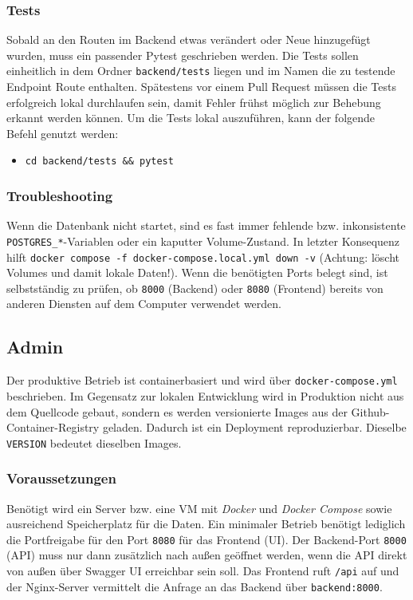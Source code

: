 \documentclass[12pt,a4paper]{article}
\begin{document}
    \subsubsection{Tests}
        Sobald an den Routen im Backend etwas verändert oder Neue hinzugefügt wurden, muss ein passender Pytest geschrieben werden.
        Die Tests sollen einheitlich in dem Ordner \texttt{backend/tests} liegen und im Namen die zu testende Endpoint Route enthalten.
        Spätestens vor einem Pull Request müssen die Tests erfolgreich lokal durchlaufen sein, damit Fehler frühst möglich zur Behebung erkannt werden können.
        Um die Tests lokal auszuführen, kann der folgende Befehl genutzt werden:
        \begin{itemize}[leftmargin=*]
            \item \texttt{cd backend/tests \&\& pytest}
        \end{itemize}

    \subsubsection{Troubleshooting}
        Wenn die Datenbank nicht startet, sind es fast immer fehlende bzw. inkonsistente \break \texttt{POSTGRES\_*}-Variablen oder ein
        kaputter Volume-Zustand. In letzter Konsequenz hilft \texttt{docker compose -f docker-compose.local.yml down -v} (Achtung: löscht Volumes und damit lokale Daten!).
        Wenn die benötigten Ports belegt sind, ist selbstständig zu prüfen, ob \texttt{8000} (Backend) oder \texttt{8080} (Frontend) bereits von anderen Diensten auf dem Computer verwendet werden.
\newpage
\subsection{Admin}
        Der produktive Betrieb ist containerbasiert und wird über \texttt{docker-compose.yml} beschrieben. Im Gegensatz zur
        lokalen Entwicklung wird in Produktion nicht aus dem Quellcode gebaut, sondern es werden versionierte Images aus der
        Github-Container-Registry geladen. Dadurch ist ein Deployment reproduzierbar. Dieselbe \texttt{VERSION} bedeutet dieselben Images.

    \subsubsection{Voraussetzungen}
        Benötigt wird ein Server bzw. eine VM mit \emph{Docker} und \emph{Docker Compose} sowie ausreichend Speicherplatz für die Daten.
        Ein minimaler Betrieb benötigt lediglich die Portfreigabe für den Port \texttt{8080} für das Frontend (UI).
        Der Backend-Port \texttt{8000} (API) muss nur dann zusätzlich nach außen geöffnet werden, wenn die API direkt von außen über Swagger UI erreichbar sein soll.
        Das Frontend ruft \texttt{/api} auf und der Nginx-Server vermittelt die Anfrage an das Backend über \texttt{backend:8000}.
\end{document}
